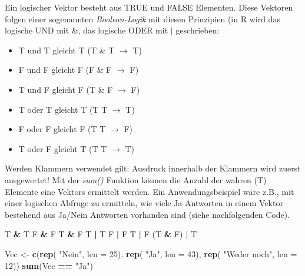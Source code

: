 \documentclass[]{article}
\newenvironment{Shaded}{\begin{snugshade}}{\end{snugshade}}
\newcommand{\KeywordTok}[1]{\textcolor[rgb]{0.13,0.29,0.53}{\textbf{#1}}}
\newcommand{\DataTypeTok}[1]{\textcolor[rgb]{0.13,0.29,0.53}{#1}}
\newcommand{\DecValTok}[1]{\textcolor[rgb]{0.00,0.00,0.81}{#1}}
\newcommand{\StringTok}[1]{\textcolor[rgb]{0.31,0.60,0.02}{#1}}
\newcommand{\OperatorTok}[1]{\textcolor[rgb]{0.81,0.36,0.00}{\textbf{#1}}}
\newcommand{\NormalTok}[1]{#1}
\providecommand{\tightlist}{%
  \setlength{\itemsep}{0pt}\setlength{\parskip}{0pt}}
\begin{document}
Ein logischer Vektor besteht aus TRUE und FALSE Elementen. Diese
Vektoren folgen einer sogenannten \emph{Boolean-Logik} mit diesen
Prinzipien (in R wird das logische UND mit \(\&\), das logische ODER mit
\(|\) geschrieben:

\begin{itemize}
\tightlist
\item
  T und T gleicht T (T \& T \(\rightarrow\) T)
\item
  F und F gleicht F (F \& F \(\rightarrow\) F)
\item
  T und F gleicht F (T \& F \(\rightarrow\) F)
\item
  T oder T gleicht T (T \textbar{} T \(\rightarrow\) T)
\item
  F oder F gleicht F (T \textbar{} T \(\rightarrow\) F)
\item
  T oder F gleicht T (T \textbar{} T \(\rightarrow\) T)
\end{itemize}

Werden Klammern verwendet gilt: Ausdruck innerhalb der Klammern wird
zuerst ausgewertet! Mit der \emph{sum()} Funktion können die Anzahl der
wahren (T) Elemente eine Vektors ermittelt werden. Ein
Anwendungsbeispiel wäre z.B., mit einer logischen Abfrage zu ermitteln,
wie viele Ja-Antworten in einem Vektor bestehend aus Ja/Nein Antworten
vorhanden sind (siehe nachfolgenden Code).

\begin{Shaded}
\begin{Highlighting}[]
\NormalTok{    T }\OperatorTok{&}\StringTok{ }\NormalTok{T}
\NormalTok{    F }\OperatorTok{&}\StringTok{ }\NormalTok{F}
\NormalTok{    T }\OperatorTok{&}\StringTok{ }\NormalTok{F}
\NormalTok{    T }\OperatorTok{|}\StringTok{ }\NormalTok{T}
\NormalTok{    F }\OperatorTok{|}\StringTok{ }\NormalTok{F}
\NormalTok{    T }\OperatorTok{|}\StringTok{ }\NormalTok{F}
\NormalTok{    (T }\OperatorTok{&}\StringTok{ }\NormalTok{F) }\OperatorTok{|}\StringTok{ }\NormalTok{T}
    
\NormalTok{    Vec <-}\StringTok{ }\KeywordTok{c}\NormalTok{(}\KeywordTok{rep}\NormalTok{( }\StringTok{"Nein"}\NormalTok{, }\DataTypeTok{len =} \DecValTok{25}\NormalTok{), }
                   \KeywordTok{rep}\NormalTok{( }\StringTok{"Ja"}\NormalTok{, }\DataTypeTok{len =} \DecValTok{43}\NormalTok{),}
                   \KeywordTok{rep}\NormalTok{( }\StringTok{"Weder noch"}\NormalTok{, }\DataTypeTok{len =} \DecValTok{12}\NormalTok{))}
    \KeywordTok{sum}\NormalTok{(Vec }\OperatorTok{==}\StringTok{ "Ja"}\NormalTok{)}
\end{Highlighting}
\end{Shaded}
\end{document}
